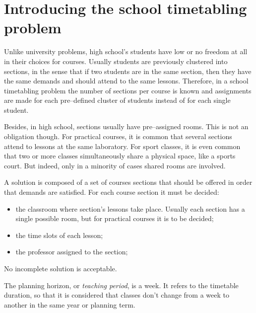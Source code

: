 
\section{Introducing the school timetabling problem}
\label{deftriedaschool}


Unlike university problems, high school's students have low or no freedom at all in their choices for courses. Usually students are previously clustered into sections, in the sense that if two students are in the same section, then they have the same demands and should attend to the same lessons. Therefore, in a school timetabling problem the number of sections per course is known and assignments are made for each pre--defined cluster of students instead of for each single student.

Besides, in high school, sections usually have pre--assigned rooms. This is not an obligation though. For practical courses, it is common that several sections attend to lessons at the same laboratory. For sport classes, it is even common that two or more classes simultaneously share a physical space, like a sports court. But indeed, only in a minority of cases shared rooms are involved.

A solution is composed of a set of courses sections that should be offered in order that demands are satisfied. For each course section it must be decided:

\begin{itemize}
\item the classroom where section's lessons take place. Usually each section has a single possible room, but for practical courses it is to be decided;
\item the time slots of each lesson;
\item the professor assigned to the section;
\end{itemize}

No incomplete solution is acceptable.

The planning horizon, or \textit{teaching period}, is a week. It refers to the timetable duration, so that it is considered that classes don't change from a week to another in the same year or planning term.
 



